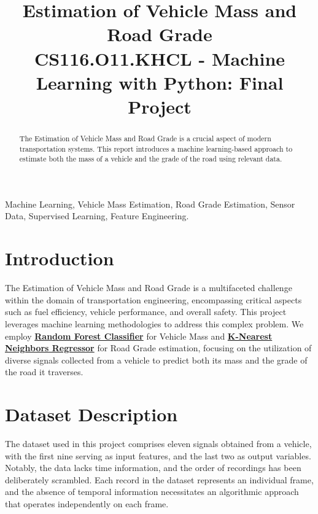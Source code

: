 \documentclass[conference]{IEEEtran}
\begin{document}
\title{Estimation of Vehicle Mass and Road Grade\\
{\footnotesize \large CS116.O11.KHCL - Machine Learning with Python: Final Project}
}

\author{ 
}

\maketitle

\begin{abstract}
    The Estimation of Vehicle Mass and Road Grade is a crucial aspect of modern transportation systems. This report introduces a machine learning-based approach to estimate both the mass of a vehicle and the grade of the road using relevant data.
\end{abstract}

\begin{IEEEkeywords}
    Machine Learning, Vehicle Mass Estimation, Road Grade Estimation, Sensor Data, Supervised Learning, Feature Engineering.
\end{IEEEkeywords}

\section{Introduction}
The Estimation of Vehicle Mass and Road Grade is a multifaceted challenge within the domain of transportation engineering, encompassing critical aspects such as fuel efficiency, vehicle performance, and overall safety. This project leverages machine learning methodologies to address this complex problem. We employ \href{https://scikit-learn.org/stable/modules/generated/sklearn.ensemble.RandomForestClassifier.html}{\textbf{Random Forest Classifier}} for Vehicle Mass and \href{https://scikit-learn.org/stable/modules/generated/sklearn.neighbors.KNeighborsRegressor.html}{\textbf{K-Nearest Neighbors Regressor}} for Road Grade estimation, focusing on the utilization of diverse signals collected from a vehicle to predict both its mass and the grade of the road it traverses.

\section{Dataset Description}
The dataset used in this project comprises eleven signals obtained from a vehicle, with the first nine serving as input features, and the last two as output variables. Notably, the data lacks time information, and the order of recordings has been deliberately scrambled. Each record in the dataset represents an individual frame, and the absence of temporal information necessitates an algorithmic approach that operates independently on each frame.
\end{document}
